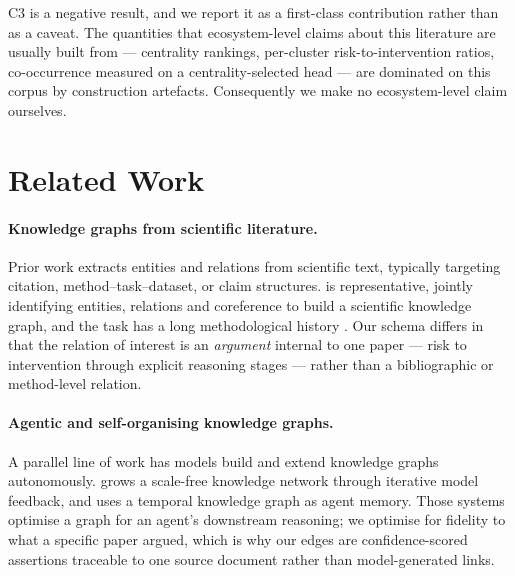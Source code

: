 \documentclass[10pt,twocolumn,letterpaper]{article}
\begin{document}
C3 is a negative result, and we report it as a first-class contribution rather
than as a caveat. The quantities that ecosystem-level claims about this
literature are usually built from --- centrality rankings, per-cluster
risk-to-intervention ratios, co-occurrence measured on a centrality-selected head
--- are dominated on this corpus by construction artefacts. Consequently we make
no ecosystem-level claim ourselves.

\section{Related Work}

\paragraph{Knowledge graphs from scientific literature.}
Prior work extracts entities and relations from scientific text, typically
targeting citation, method--task--dataset, or claim structures.
\citet{luan2018scierc} is representative, jointly identifying entities, relations
and coreference to build a scientific knowledge graph, and the task has a long
methodological history \citep{bach2007relation}. Our schema differs in that the
relation of interest is an \emph{argument} internal to one paper --- risk to
intervention through explicit reasoning stages --- rather than a bibliographic or
method-level relation.

\paragraph{Agentic and self-organising knowledge graphs.}
A parallel line of work has models build and extend knowledge graphs
autonomously. \citet{buehler2025agentic} grows a scale-free knowledge network
through iterative model feedback, and \citet{rasmussen2025zep} uses a temporal
knowledge graph as agent memory. Those systems optimise a graph for an agent's
downstream reasoning; we optimise for fidelity to what a specific paper argued,
which is why our edges are confidence-scored assertions traceable to one source
document rather than model-generated links.
\end{document}
